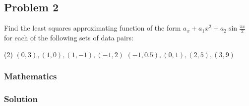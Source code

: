 \subsection{Problem 2}%
\label{sec:problem_2}
Find the least squares approximating function of the form
$a_x+a_1x^2+a_2\sin{\frac{\pi{}x}{2}}$ for each of the following sets of data pairs:
\begin{tasks}(2)
  \task $(0,3),(1,0),(1,-1),(-1,2)$
  \task $(-1,0.5),(0,1),(2,5),(3,9)$
\end{tasks}
\subsubsection*{Mathematics}
\subsubsection*{Solution}
